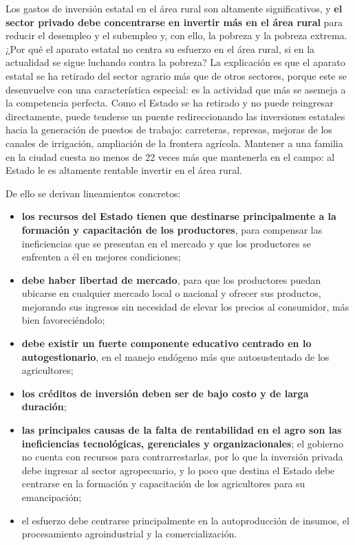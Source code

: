 \documentclass[
  man,
  floatsintext,
  longtable,
  a4paper,
  nolmodern,
  notxfonts,
  notimes,
  12pt,
  colorlinks=true,linkcolor=blue,citecolor=blue,urlcolor=blue]{apa7}
\providecommand{\tightlist}{%
  \setlength{\itemsep}{0pt}\setlength{\parskip}{0pt}}
\begin{document}
Los gastos de inversión estatal en el área rural son altamente
significativos, y \textbf{el sector privado debe concentrarse en
invertir más en el área rural} para reducir el desempleo y el subempleo
y, con ello, la pobreza y la pobreza extrema. ¿Por qué el aparato
estatal no centra su esfuerzo en el área rural, si en la actualidad se
sigue luchando contra la pobreza? La explicación es que el aparato
estatal se ha retirado del sector agrario más que de otros sectores,
porque este se desenvuelve con una característica especial: es la
actividad que más se asemeja a la competencia perfecta. Como el Estado
se ha retirado y no puede reingresar directamente, puede tenderse un
puente redireccionando las inversiones estatales hacia la generación de
puestos de trabajo: carreteras, represas, mejoras de los canales de
irrigación, ampliación de la frontera agrícola. Mantener a una familia
en la ciudad cuesta no menos de 22 veces más que mantenerla en el campo:
al Estado le es altamente rentable invertir en el área rural.

De ello se derivan lineamientos concretos:

\begin{itemize}
\tightlist
\item
  \textbf{los recursos del Estado tienen que destinarse principalmente a
  la formación y capacitación de los productores}, para compensar las
  ineficiencias que se presentan en el mercado y que los productores se
  enfrenten a él en mejores condiciones;
\item
  \textbf{debe haber libertad de mercado}, para que los productores
  puedan ubicarse en cualquier mercado local o nacional y ofrecer sus
  productos, mejorando sus ingresos sin necesidad de elevar los precios
  al consumidor, más bien favoreciéndolo;
\item
  \textbf{debe existir un fuerte componente educativo centrado en lo
  autogestionario}, en el manejo endógeno más que autosustentado de los
  agricultores;
\item
  \textbf{los créditos de inversión deben ser de bajo costo y de larga
  duración};
\item
  \textbf{las principales causas de la falta de rentabilidad en el agro
  son las ineficiencias tecnológicas, gerenciales y organizacionales};
  el gobierno no cuenta con recursos para contrarrestarlas, por lo que
  la inversión privada debe ingresar al sector agropecuario, y lo poco
  que destina el Estado debe centrarse en la formación y capacitación de
  los agricultores para su emancipación;
\item
  el esfuerzo debe centrarse principalmente en la autoproducción de
  insumos, el procesamiento agroindustrial y la comercialización.
\end{itemize}
\end{document}

